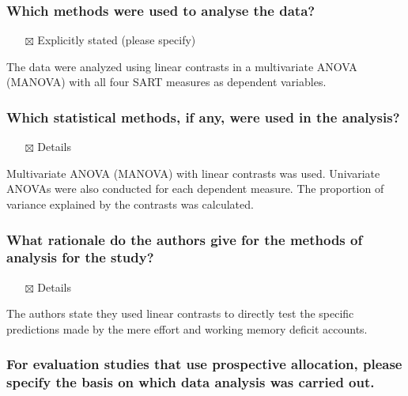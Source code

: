 \documentclass[
  doc, a4paper]{apa7}
\providecommand{\tightlist}{%
  \setlength{\itemsep}{0pt}\setlength{\parskip}{0pt}}
\begin{document}
\subsubsection{Which methods were used to analyse the data?}\label{which-methods-were-used-to-analyse-the-data}

\begin{itemize}
\tightlist
\item[$\boxtimes$]
  Explicitly stated (please specify)
\end{itemize}

The data were analyzed using linear contrasts in a multivariate ANOVA (MANOVA) with all four SART measures as dependent variables.

\subsubsection{Which statistical methods, if any, were used in the analysis?}\label{which-statistical-methods-if-any-were-used-in-the-analysis}

\begin{itemize}
\tightlist
\item[$\boxtimes$]
  Details
\end{itemize}

Multivariate ANOVA (MANOVA) with linear contrasts was used. Univariate ANOVAs were also conducted for each dependent measure. The proportion of variance explained by the contrasts was calculated.

\subsubsection{What rationale do the authors give for the methods of analysis for the study?}\label{what-rationale-do-the-authors-give-for-the-methods-of-analysis-for-the-study}

\begin{itemize}
\tightlist
\item[$\boxtimes$]
  Details
\end{itemize}

The authors state they used linear contrasts to directly test the specific predictions made by the mere effort and working memory deficit accounts.

\subsubsection{For evaluation studies that use prospective allocation, please specify the basis on which data analysis was carried out.}\label{for-evaluation-studies-that-use-prospective-allocation-please-specify-the-basis-on-which-data-analysis-was-carried-out.}
\end{document}
